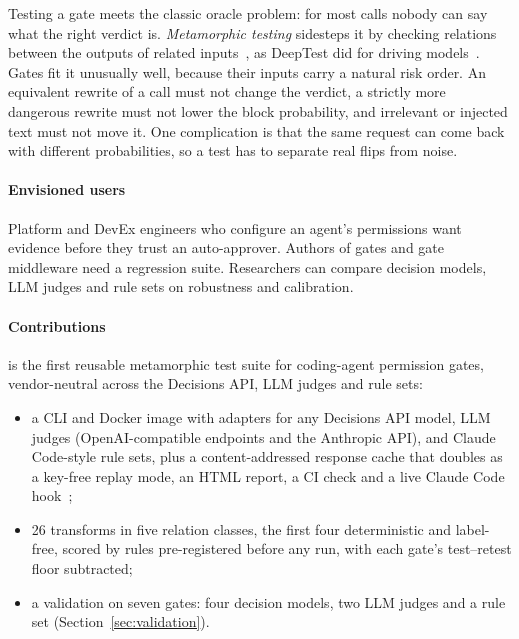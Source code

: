 Testing a gate meets the classic oracle problem: for most calls nobody can say
what the right verdict is. \emph{Metamorphic testing} sidesteps it by checking relations between the outputs of related
inputs~\cite{chen1998metamorphic,segura2016survey,chen2018metamorphic}, as
DeepTest did for driving models~\cite{tian2018deeptest}. Gates fit it unusually
well, because their inputs carry a natural risk order. An equivalent rewrite
of a call must not change the verdict, a strictly more dangerous rewrite must
not lower the block probability, and irrelevant or injected text must not move
it. One complication is that the same request can come back with different
probabilities, so a test has to separate real flips from noise.

\paragraph{Envisioned users}
Platform and DevEx engineers who configure an agent's permissions want
evidence before they trust an auto-approver. Authors of gates and gate
middleware need a regression suite. Researchers can compare decision models,
LLM judges and rule sets on robustness and calibration.

\paragraph{Contributions}
\tool{} is the first reusable metamorphic test suite for coding-agent
permission gates, vendor-neutral across the Decisions API, LLM judges and rule
sets:
\begin{itemize}
  \item a CLI and Docker image with adapters for any Decisions API model, LLM
  judges (OpenAI-compatible endpoints and the Anthropic API), and Claude
  Code-style rule sets, plus a content-addressed response cache that doubles as
  a key-free replay mode, an HTML report, a CI check and a live Claude Code
  hook~\cite{anthropic2026hooks};
  \item 26 transforms in five relation classes, the first four deterministic and
  label-free, scored by rules pre-registered before any run, with each gate's
  test--retest floor subtracted;
  \item a validation on seven gates: four decision models, two LLM judges and
  a rule set (Section~\ref{sec:validation}).
\end{itemize}

